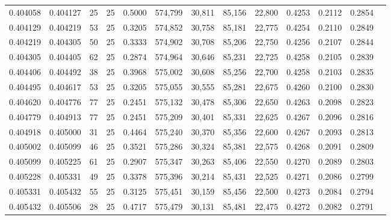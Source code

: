 \begin{tabular}{rrrrrrrrrrrrr}
0.404058 & 0.404127 &    25 &  25 &                                     0.5000 & 574,799 &  30,811 &  85,156 &  22,800 & 0.4253 & 0.2112 & 0.2854 \\
0.404129 & 0.404219 &    53 &  25 &                                     0.3205 & 574,852 &  30,758 &  85,181 &  22,775 & 0.4254 & 0.2110 & 0.2849 \\
0.404219 & 0.404305 &    50 &  25 &                                     0.3333 & 574,902 &  30,708 &  85,206 &  22,750 & 0.4256 & 0.2107 & 0.2844 \\
0.404305 & 0.404405 &    62 &  25 &                                     0.2874 & 574,964 &  30,646 &  85,231 &  22,725 & 0.4258 & 0.2105 & 0.2839 \\
0.404406 & 0.404492 &    38 &  25 &                                     0.3968 & 575,002 &  30,608 &  85,256 &  22,700 & 0.4258 & 0.2103 & 0.2835 \\
0.404495 & 0.404617 &    53 &  25 &                                     0.3205 & 575,055 &  30,555 &  85,281 &  22,675 & 0.4260 & 0.2100 & 0.2830 \\
0.404620 & 0.404776 &    77 &  25 &                                     0.2451 & 575,132 &  30,478 &  85,306 &  22,650 & 0.4263 & 0.2098 & 0.2823 \\
0.404779 & 0.404913 &    77 &  25 &                                     0.2451 & 575,209 &  30,401 &  85,331 &  22,625 & 0.4267 & 0.2096 & 0.2816 \\
0.404918 & 0.405000 &    31 &  25 &                                     0.4464 & 575,240 &  30,370 &  85,356 &  22,600 & 0.4267 & 0.2093 & 0.2813 \\
0.405002 & 0.405099 &    46 &  25 &                                     0.3521 & 575,286 &  30,324 &  85,381 &  22,575 & 0.4268 & 0.2091 & 0.2809 \\
0.405099 & 0.405225 &    61 &  25 &                                     0.2907 & 575,347 &  30,263 &  85,406 &  22,550 & 0.4270 & 0.2089 & 0.2803 \\
0.405228 & 0.405331 &    49 &  25 &                                     0.3378 & 575,396 &  30,214 &  85,431 &  22,525 & 0.4271 & 0.2086 & 0.2799 \\
0.405331 & 0.405432 &    55 &  25 &                                     0.3125 & 575,451 &  30,159 &  85,456 &  22,500 & 0.4273 & 0.2084 & 0.2794 \\
0.405432 & 0.405506 &    28 &  25 &                                     0.4717 & 575,479 &  30,131 &  85,481 &  22,475 & 0.4272 & 0.2082 & 0.2791 \\

\end{tabular}
